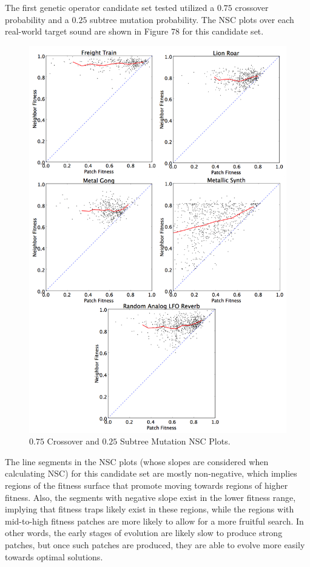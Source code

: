 \documentclass[12pt]{report} 	%
\numberwithin{figure}{chapter}
\numberwithin{table}{chapter}
\numberwithin{equation}{chapter}
\begin{document}
\begin{flushleft}
The first genetic operator candidate set tested utilized a $0.75$ crossover probability and a $0.25$ subtree mutation probability. The NSC plots over each real-world target sound are shown in Figure 78 for this candidate set.
\begin{figure}[h!]
\begin{center}
\includegraphics[scale=0.15]{GOPS_Param2}
\caption[$0.75$ Crossover and $0.25$ subtree mutation NSC plots]{$0.75$ Crossover and $0.25$ Subtree Mutation NSC Plots.}
\end{center}
\end{figure}

The line segments in the NSC plots (whose slopes are considered when calculating NSC) for this candidate set are mostly non-negative, which implies regions of the fitness surface that promote moving towards regions of higher fitness. Also, the segments with negative slope exist in the lower fitness range, implying that fitness traps likely exist in these regions, while the regions with mid-to-high fitness patches are more likely to allow for a more fruitful search. In other words, the early stages of evolution are likely slow to produce strong patches, but once such patches are produced, they are able to evolve more easily towards optimal solutions.


\end{flushleft}
\end{document}
